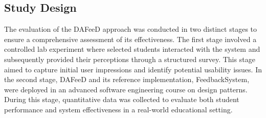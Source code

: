 \documentclass[sigconf,screen,review,anonymous]{acmart}
\begin{document}


\subsection{Study Design}
The evaluation of the DAFeeD approach was conducted in two distinct stages to ensure a comprehensive assessment of its effectiveness.
The first stage involved a controlled lab experiment where selected students interacted with the system and subsequently provided their perceptions through a structured survey.
This stage aimed to capture initial user impressions and identify potential usability issues.
In the second stage, DAFeeD and its reference implementation, FeedbackSystem, were deployed in an advanced software engineering course on design patterns.
During this stage, quantitative data was collected to evaluate both student performance and system effectiveness in a real-world educational setting.
\end{document}
